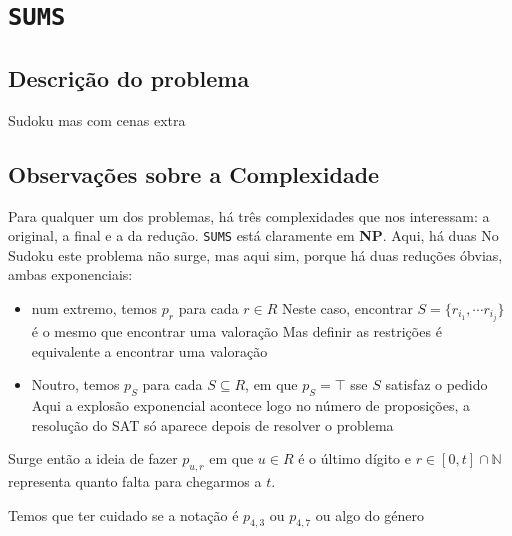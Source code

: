 \documentclass[a4paper,12pt]{article}
\newcommand{\sums}{\texttt{SUMS}\xspace}
\newcommand{\np}{\textbf{NP}\xspace}
\begin{document}
\section{\sums}
\subsection{Descrição do problema}
Sudoku mas com cenas extra

\subsection{Observações sobre a Complexidade}
Para qualquer um dos problemas, há três complexidades que nos interessam: a
original, a final e a da redução. 
\sums está claramente em \np.
Aqui, há duas
No Sudoku este problema não surge, mas aqui sim, porque há duas reduções
óbvias, ambas exponenciais:
\begin{itemize}
   \item num extremo, temos $p_r$ para cada $r\in R$ Neste caso, encontrar
      $S=\{r_{i_1},\cdots r_{i_j}\}$ é o mesmo que encontrar uma valoração
      Mas definir as restrições é equivalente a encontrar uma valoração

   \item Noutro, temos $p_S$ para cada $S\subseteq R$, em que $p_S=\top$ sse
      $S$ satisfaz o pedido
      Aqui a explosão exponencial acontece logo no número de proposições, a
      resolução do SAT só aparece depois de resolver o problema
\end{itemize}

Surge então a ideia de fazer $p_{u,r}$ em que $u\in R$ é o último dígito e
$r\in [0,t]\cap\mathbb N$ representa quanto falta para chegarmos a $t$.

Temos que ter cuidado se a notação é $p_{4,3}$ ou $p_{4,7}$ ou algo do género
\end{document}
